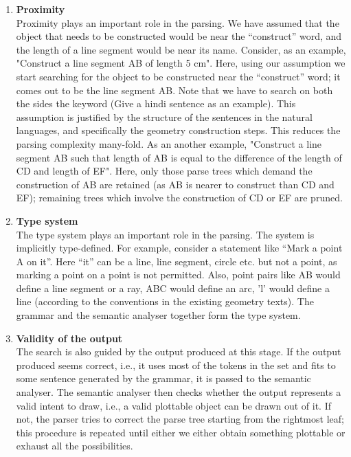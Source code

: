 \def\DevnagVersion{2.15}\documentclass[12pt]{article}
\begin{document}
\begin{enumerate}
\item \textbf{Proximity}\label{sec:proximity}\\
Proximity plays an important role in the parsing. We have assumed that the object that needs to be constructed would be near the ``construct'' word, and the length of a line segment would be near its name. Consider, as an example, "Construct a line segment AB of length 5 cm". Here, using our assumption we start searching for the object to be constructed near the ``construct'' word; it comes out to be the line segment AB. Note that we have to search on both the sides the keyword (Give a hindi sentence as an example). This assumption is justified by the structure of the sentences in the natural languages, and specifically the geometry construction steps. This reduces the parsing complexity many-fold. As an another example, "Construct a line segment AB such that length of AB is equal to the difference of the length of CD and length of EF". Here, only those parse trees which demand the construction of AB are retained (as AB is nearer to construct than CD and EF); remaining trees which involve the construction of CD or EF are pruned.

\item \textbf{Type system}\\
The type system plays an important role in the parsing. The system is implicitly type-defined. For example, consider a statement like  ``Mark a point A on it''. Here ``it'' can be a line, line segment, circle etc. but not a point, as marking a point on a point is not permitted. Also, point pairs like AB would define a line segment or a ray, ABC would define an arc, 'l' would define a line (according to the conventions in the existing geometry texts). The grammar and the semantic analyser together form the type system.

\item \textbf{Validity of the output}\\
The search is also guided by the output produced at this stage. If the output produced seems correct, i.e., it uses most of the tokens in the set and fits to some sentence generated by the grammar, it is passed to the semantic analyser. The semantic analyser then checks whether the output represents a valid intent to draw, i.e., a valid plottable object can be drawn out of it. If not, the parser tries to correct the parse tree starting from the rightmost leaf; this procedure is repeated until either we either obtain something plottable or exhaust all the possibilities.

\end{enumerate}
\end{document}
